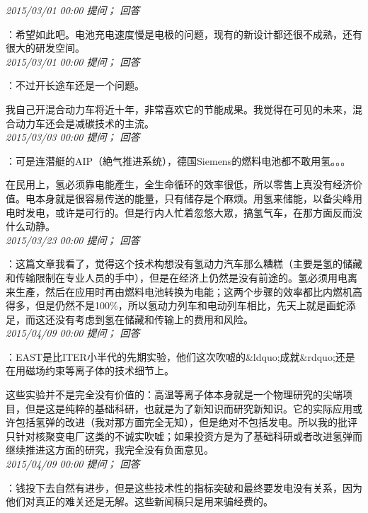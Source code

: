 \documentclass[twocolumn]{ctexart}
\begin{document}
\textit{\hfill\noindent\small 2015/03/01 00:00 提问； 回答}

：希望如此吧。电池充电速度慢是电极的问题，现有的新设计都还很不成熟，还有很大的研发空间。\\

\textit{\hfill\noindent\small 2015/03/01 00:00 提问； 回答}

：不过开长途车还是一个问题。

我自己开混合动力车将近十年，非常喜欢它的节能成果。我觉得在可见的未来，混合动力车还会是减碳技术的主流。\\

\textit{\hfill\noindent\small 2015/03/03 00:00 提问； 回答}

：可是连潜艇的AIP（絶气推进系统），德国Siemens的燃料电池都不敢用氢。。。

在民用上，氢必须靠电能產生，全生命循环的效率很低，所以零售上真没有经济价值。电本身就是很容易传送的能量，只有储存是个麻烦。用氢来储能，以备尖峰用电时发电，或许是可行的。但是行内人忙着忽悠大眾，搞氢气车，在那方面反而没什么动静。\\

\textit{\hfill\noindent\small 2015/03/23 00:00 提问； 回答}

：这篇文章我看了，觉得这个技术构想没有氢动力汽车那么糟糕（主要是氢的储藏和传输限制在专业人员的手中），但是在经济上仍然是没有前途的。氢必须用电离来生產，然后在应用时再由燃料电池转换为电能；这两个步骤的效率都比内燃机高得多，但是仍然不是100\%，所以氢动力列车和电动列车相比，先天上就是画蛇添足，而这还没有考虑到氢在储藏和传输上的费用和风险。\\

\textit{\hfill\noindent\small 2015/04/09 00:00 提问； 回答}

：EAST是比ITER小半代的先期实验，他们这次吹嘘的\&ldquo;成就\&rdquo;还是在用磁场约束等离子体的技术细节上。

这些实验并不是完全没有价值的：高温等离子体本身就是一个物理研究的尖端项目，但是这是纯粹的基础科研，也就是为了新知识而研究新知识。它的实际应用或许包括氢弹的改进（我对那方面完全无知），但是绝对不包括发电。所以我的批评只针对核聚变电厂这类的不诚实吹嘘；如果投资方是为了基础科研或者改进氢弹而继续推进这方面的研究，我完全没有负面意见。\\

\textit{\hfill\noindent\small 2015/04/09 00:00 提问； 回答}

：钱投下去自然有进步，但是这些技术性的指标突破和最终要发电没有关系，因为他们对真正的难关还是无解。这些新闻稿只是用来骗经费的。
\end{document}
